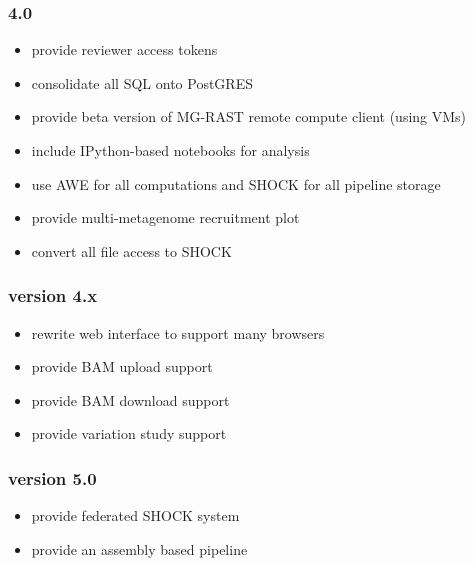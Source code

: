 \documentclass[letterpaper,10pt,english]{sphinxmanual}
\begin{document}
\subsubsection{4.0}
\label{\detokenize{user_manual:id7}}\begin{itemize}
\item {} 
provide reviewer access tokens

\item {} 
consolidate all SQL onto PostGRES

\item {} 
provide beta version of MG-RAST remote compute client (using VMs)

\item {} 
include IPython-based notebooks for analysis

\item {} 
use AWE for all computations and SHOCK for all pipeline storage

\item {} 
provide multi-metagenome recruitment plot

\item {} 
convert all file access to SHOCK

\end{itemize}


\subsubsection{version 4.x}
\label{\detokenize{user_manual:version-4-x}}\begin{itemize}
\item {} 
rewrite web interface to support many browsers

\item {} 
provide BAM upload support

\item {} 
provide BAM download support

\item {} 
provide variation study support

\end{itemize}


\subsubsection{version 5.0}
\label{\detokenize{user_manual:version-5-0}}\begin{itemize}
\item {} 
provide federated SHOCK system

\item {} 
provide an assembly based pipeline

\end{itemize}
\end{document}
